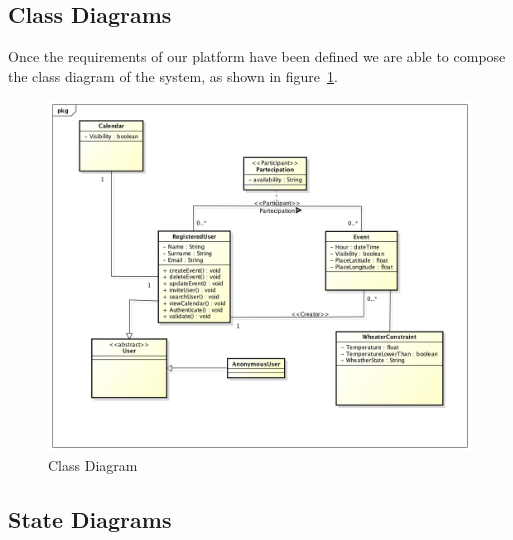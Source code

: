 \subsection{Class Diagrams}
Once the requirements of our platform have been defined we are able to compose the class diagram  of the system, as shown in figure~\ref{fig:classdiagram}.
\begin{center}
 \begin{figure}[H]
    \includegraphics[width=1\textwidth]{../UMLDiagram/class/WeatherCalClassDiagram/ClassDiagram0.png}
    \caption{Class Diagram}
     \label{fig:classdiagram}
     \end{figure}
   \end{center}
\subsection{State Diagrams}
